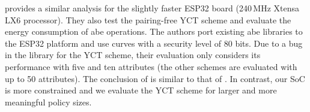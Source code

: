 \cite{girgenti_feasibility_2019} provides a similar analysis for the slightly faster ESP32 board (240\,MHz Xtensa LX6 processor).
They also test the pairing-free YCT scheme \cite{yao_lightweight_2015} and evaluate the energy consumption of \acrshort{abe} operations.
The authors port existing \acrshort{abe} libraries to the ESP32 platform and use curves with a security level of 80 bits.
Due to a bug in the library for the YCT scheme, their evaluation only considers its performance with five and ten attributes (the other schemes are evaluated with up to 50 attributes).
The conclusion of \cite{girgenti_feasibility_2019} is similar to that of \cite{borgh_attribute-based_2016}. 
In contrast, our SoC is more constrained and we evaluate the YCT scheme for larger and more meaningful policy sizes.